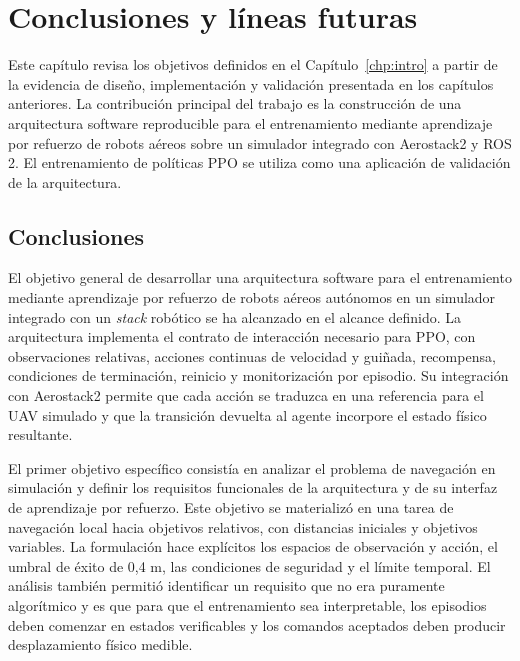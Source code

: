 \chapter{Conclusiones y líneas futuras} \label{chp:conclusiones}

Este capítulo revisa los objetivos definidos en el
Capítulo~\ref{chp:intro} a partir de la evidencia de diseño, implementación y
validación presentada en los capítulos anteriores. La contribución principal del
trabajo es la construcción de una arquitectura software reproducible para el
entrenamiento mediante aprendizaje por refuerzo de robots aéreos sobre un
simulador integrado con Aerostack2 y ROS 2.
El entrenamiento de políticas PPO se utiliza como una aplicación de validación
de la arquitectura.

\section{Conclusiones} \label{sct:conclusiones:conclusiones}

El objetivo general de desarrollar una arquitectura software para el
entrenamiento mediante aprendizaje por refuerzo de robots aéreos autónomos en un
simulador integrado con un \emph{stack} robótico se ha alcanzado en el alcance
definido. La arquitectura implementa el contrato de interacción necesario para PPO,
con observaciones relativas, acciones continuas de velocidad y guiñada,
recompensa, condiciones de terminación, reinicio y monitorización por episodio.
Su integración con Aerostack2 permite que cada acción se traduzca en una
referencia para el UAV simulado y que la transición devuelta al agente incorpore
el estado físico resultante.

El primer objetivo específico consistía en analizar el problema de navegación
en simulación y definir los requisitos funcionales de la arquitectura y de su
interfaz de aprendizaje por refuerzo. Este objetivo se materializó en una tarea
de navegación local hacia objetivos relativos, con distancias iniciales y
objetivos variables. La formulación hace explícitos los espacios de observación
y acción, el umbral de éxito de 0,4 m, las condiciones de seguridad y el límite
temporal. El análisis también permitió identificar un requisito que no era
puramente algorítmico y es que para que el entrenamiento sea interpretable, los
episodios deben comenzar en estados verificables y los comandos aceptados deben
producir desplazamiento físico medible.

